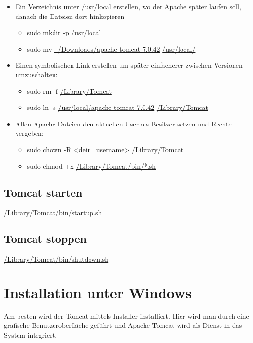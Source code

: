 \begin{itemize}
\item Ein Verzeichnis unter \href{file:///usr/local}{/usr/local} erstellen, wo der Apache später laufen soll, danach die Dateien dort hinkopieren
\begin{itemize}
	\item sudo mkdir -p \href{file:///usr/local}{/usr/local}
	\item sudo mv \href{file:///Users/stefan/Downloads/apache-tomcat-7.0.42}{~/Downloads/apache-tomcat-7.0.42} \href{file:///usr/local}{/usr/local/}
\end{itemize}\item Einen symbolischen Link erstellen um später einfacherer zwischen Versionen umzuschalten:
\begin{itemize}
	\item sudo rm -f \href{file:///Library/Tomcat}{/Library/Tomcat}
	\item sudo ln -s \href{file:///usr/local/apache-tomcat-7.0.42}{/usr/local/apache-tomcat-7.0.42} \href{file:///Library/Tomcat}{/Library/Tomcat}
\end{itemize}\item Allen Apache Dateien den aktuellen User als Besitzer setzen und Rechte vergeben:
\begin{itemize}
	\item sudo chown -R \textless{}dein\_username\textgreater{} \href{file:///Library/Tomcat}{/Library/Tomcat}
	\item sudo chmod +x \href{file:///Library/Tomcat/bin/*.sh}{/Library/Tomcat/bin/*.sh}
\end{itemize}\end{itemize}

\subsection{Tomcat starten}

\href{file:///Library/Tomcat/bin/startup.sh}{/Library/Tomcat/bin/startup.sh}

\subsection{Tomcat stoppen}

\href{file:///Library/Tomcat/bin/shutdown.sh}{/Library/Tomcat/bin/shutdown.sh}

\section{Installation unter Windows}

Am besten wird der Tomcat mittels Installer installiert. Hier wird man durch eine grafische Benutzeroberfläche geführt und Apache Tomcat wird als Dienst in das System integriert. 


